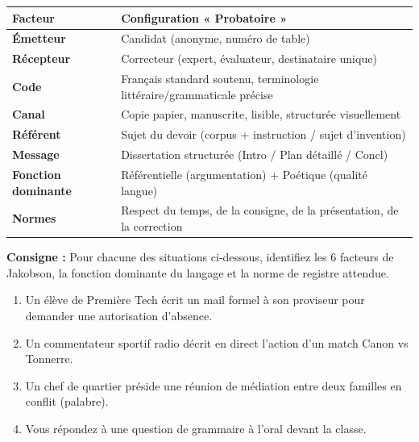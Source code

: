 \documentclass[11pt]{article}
\begin{document}
\begin{aretenir}
\begin{center}
\begin{tabularx}{\linewidth}{|l|X|}\hline
\rowcolor{popgreenL}
\textbf{Facteur} & \textbf{Configuration « Probatoire »} \\ \hline
\textbf{Émetteur} & Candidat (anonyme, numéro de table) \\ \hline
\textbf{Récepteur} & Correcteur (expert, évaluateur, destinataire unique) \\ \hline
\textbf{Code} & Français standard soutenu, terminologie littéraire/grammaticale précise \\ \hline
\textbf{Canal} & Copie papier, manuscrite, lisible, structurée visuellement \\ \hline
\textbf{Référent} & Sujet du devoir (corpus + instruction / sujet d'invention) \\ \hline
\textbf{Message} & Dissertation structurée (Intro / Plan détaillé / Concl) \\ \hline
\textbf{Fonction dominante} & Référentielle (argumentation) + Poétique (qualité langue) \\ \hline
\textbf{Normes} & Respect du temps, de la consigne, de la présentation, de la correction \\ \hline
\end{tabularx}
\end{center}
\end{aretenir}

\begin{exercice}
\textbf{Consigne :} Pour chacune des situations ci-dessous, identifiez les 6 facteurs de Jakobson, la fonction dominante du langage et la norme de registre attendue.
\begin{enumerate}
    \item Un élève de Première Tech écrit un mail formel à son proviseur pour demander une autorisation d'absence.
    \item Un commentateur sportif radio décrit en direct l'action d'un match Canon vs Tonnerre.
    \item Un chef de quartier préside une réunion de médiation entre deux familles en conflit (palabre).
    \item Vous répondez à une question de grammaire à l'oral devant la classe.
\end{enumerate}
\end{exercice}
\end{document}
